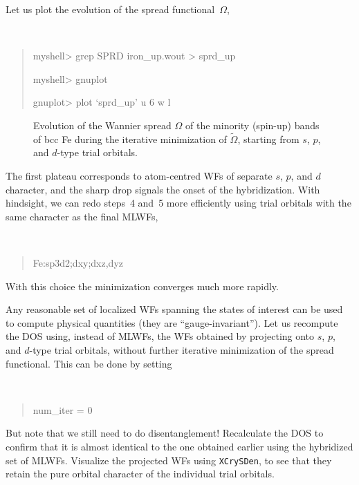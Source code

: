 \documentclass[a4paper,11pt,twoside]{article}
\begin{document}
Let us plot the evolution of the spread functional~$\Omega$,
%
{\tt
\begin{quote}
myshell> grep SPRD iron\_up.wout > sprd\_up

myshell> gnuplot

gnuplot> plot `sprd\_up' u 6  w l
\end{quote}
}

\begin{figure}[h]
\begin{center}
\caption{Evolution of the Wannier spread $\Omega$ of the minority
  (spin-up) bands of bcc Fe during the iterative minimization of
  $\widetilde{\Omega}$, starting from $s$, $p$, and $d$-type trial
  orbitals.}
\label{fig:Fe-sprd}
\end{center}
\end{figure}


The first plateau corresponds to atom-centred WFs of separate $s$,
$p$, and $d$ character, and the sharp drop signals the onset of the
hybridization. With hindsight, we can redo steps~4 and~5 more
efficiently using trial orbitals with the same character as the final
MLWFs,
%
{\tt
\begin{quote}
Fe:sp3d2;dxy;dxz,dyz
\end{quote}
}
%
With this choice the minimization converges much more rapidly.

Any reasonable set of localized WFs spanning the states of interest
can be used to compute physical quantities (they are
``gauge-invariant''). Let us recompute the DOS using, instead of
MLWFs, the WFs obtained by projecting onto $s$, $p$, and $d$-type
trial orbitals, without further iterative minimization of the spread
functional. This can be done by setting
%
{\tt
\begin{quote}
num\_iter = 0
\end{quote}
}
%
But note that we still need to do disentanglement!
Recalculate the DOS to confirm that it is almost identical to the one
obtained earlier using the hybridized set of MLWFs. Visualize the
projected WFs using {\tt XCrySDen}, to see that they retain the pure
orbital character of the individual trial orbitals.
\end{document}
